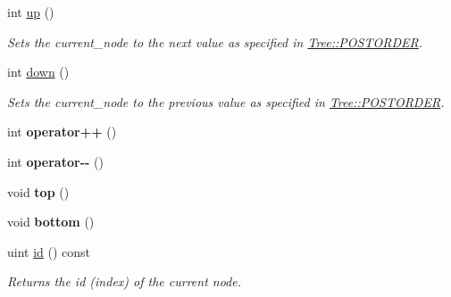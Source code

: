 \begin{DoxyCompactItemize}
\mbox{\label{classTreeIterator_adca1d999f093a69e2f5d044b358e5da7}} 
int \hyperlink{classTreeIterator_adca1d999f093a69e2f5d044b358e5da7}{up} ()
\begin{DoxyCompactList}\small\item\em Sets the {\ttfamily current\+\_\+node} to the next value as specified in \hyperlink{classTree_a310e76b803db38e7067514822b21a58f}{Tree\+::\+P\+O\+S\+T\+O\+R\+D\+ER}. \end{DoxyCompactList}\item 
\mbox{\label{classTreeIterator_a8534adba213df8f7f1e67bf5005d902e}} 
int \hyperlink{classTreeIterator_a8534adba213df8f7f1e67bf5005d902e}{down} ()
\begin{DoxyCompactList}\small\item\em Sets the {\ttfamily current\+\_\+node} to the previous value as specified in \hyperlink{classTree_a310e76b803db38e7067514822b21a58f}{Tree\+::\+P\+O\+S\+T\+O\+R\+D\+ER}. \end{DoxyCompactList}\item 
\mbox{\label{classTreeIterator_aed2ad905c7c0cef8c2fd8e012c67dc5c}} 
int {\bfseries operator++} ()
\item 
\mbox{\label{classTreeIterator_a08d18c38de3157a78b9d02899a605ed8}} 
int {\bfseries operator-\/-\/} ()
\item 
\mbox{\label{classTreeIterator_a41f74b1ac47cd05ce7e08b46c93034f1}} 
void {\bfseries top} ()
\item 
\mbox{\label{classTreeIterator_a1c8244cded3c2a573d2914549a19e177}} 
void {\bfseries bottom} ()
\item 
\mbox{\label{classTreeIterator_a1ad0126da70f20e1b0c5ab71940edbfe}} 
uint \hyperlink{classTreeIterator_a1ad0126da70f20e1b0c5ab71940edbfe}{id} () const
\begin{DoxyCompactList}\small\item\em Returns the id (index) of the current node. \end{DoxyCompactList}\item 
\mbox{\label{classTreeIterator_a0c472982f19ce786b1804604630e8b70}} 

\end{DoxyCompactItemize}
